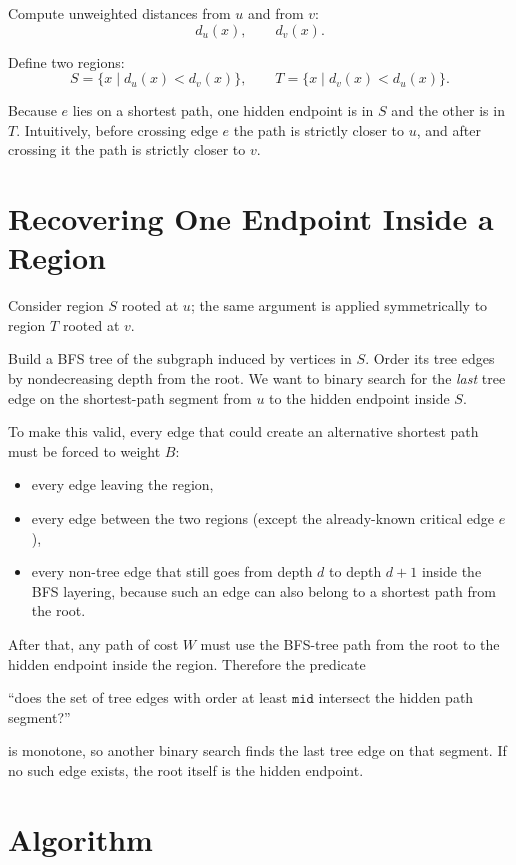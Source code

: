 \documentclass[11pt,a4paper]{article}
\begin{document}
Compute unweighted distances from $u$ and from $v$:
\[
  d_u(x), \qquad d_v(x).
\]

Define two regions:
\[
  S = \{x \mid d_u(x) < d_v(x)\}, \qquad
  T = \{x \mid d_v(x) < d_u(x)\}.
\]

Because $e$ lies on a shortest path, one hidden endpoint is in $S$ and the
other is in $T$. Intuitively, before crossing edge $e$ the path is strictly
closer to $u$, and after crossing it the path is strictly closer to $v$.

\section{Recovering One Endpoint Inside a Region}

Consider region $S$ rooted at $u$; the same argument is applied symmetrically
to region $T$ rooted at $v$.

Build a BFS tree of the subgraph induced by vertices in $S$. Order its tree
edges by nondecreasing depth from the root. We want to binary search for the
\emph{last} tree edge on the shortest-path segment from $u$ to the hidden
endpoint inside $S$.

To make this valid, every edge that could create an alternative shortest path
must be forced to weight $B$:
\begin{itemize}
  \item every edge leaving the region,
  \item every edge between the two regions (except the already-known critical
        edge $e$),
  \item every non-tree edge that still goes from depth $d$ to depth $d+1$
        inside the BFS layering, because such an edge can also belong to a
        shortest path from the root.
\end{itemize}

After that, any path of cost $W$ must use the BFS-tree path from the root to
the hidden endpoint inside the region. Therefore the predicate

\medskip
\centerline{``does the set of tree edges with order at least $\texttt{mid}$ intersect
the hidden path segment?''}
\medskip

is monotone, so another binary search finds the last tree edge on that segment.
If no such edge exists, the root itself is the hidden endpoint.

\section{Algorithm}
\end{document}
